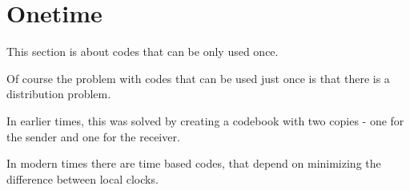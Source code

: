 \hypertarget{onetime}{%
\section{Onetime}\label{onetime}}

This section is about codes that can be only used once.

Of course the problem with codes that can be used just once is that
there is a distribution problem.

In earlier times, this was solved by creating a codebook with two copies
- one for the sender and one for the receiver.

In modern times there are time based codes, that depend on minimizing
the difference between local clocks.
